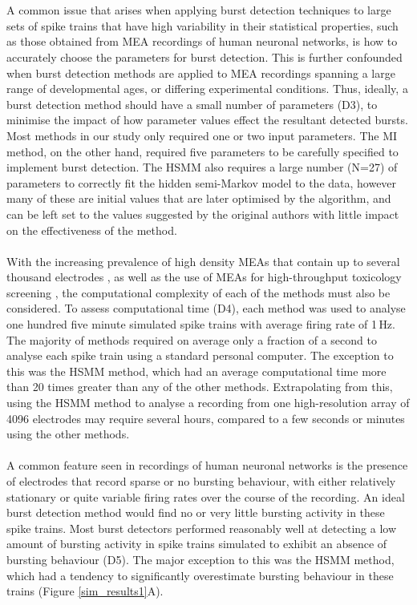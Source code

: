 \documentclass[12pt, titlepage]{article}
\begin{document}
	\\ \\ A common issue that arises when applying burst detection techniques to large sets of spike trains that have high variability in their statistical properties, such as those obtained from MEA recordings of human neuronal networks, is how to accurately choose the parameters for burst detection. This is further confounded when burst detection methods are applied to MEA recordings spanning a large range of developmental ages, or differing experimental conditions. Thus, ideally, a burst detection method should have a small number of parameters (D3), to minimise the impact of how parameter values effect the resultant detected bursts. Most methods in our study only required one or two input parameters. The MI method, on the other hand, required five parameters to be carefully specified to implement burst detection. The HSMM also requires a large number (N=27) of parameters to correctly fit the hidden semi-Markov model to the data, however many of these are initial values that are later optimised by the algorithm, and can be left set to the values suggested by the original authors with little impact on the effectiveness of the method. 
	\\ \\ With the increasing prevalence of high density MEAs that contain up to several thousand electrodes \cite{Maccione2014}, as well as the use of MEAs for high-throughput toxicology screening \cite{Breier2008}, the computational complexity of each of the methods must also be considered. To assess computational time (D4), each method was used to analyse one hundred five minute simulated spike trains with average firing rate of 1$\,$Hz. The majority of methods required on average only a fraction of a second to analyse each spike train using a standard personal computer. The exception to this was the HSMM method, which had an average computational time more than 20 times greater than any of the other methods. Extrapolating from this, using the HSMM method to analyse a recording from one high-resolution array of 4096 electrodes may require several hours, compared to a few seconds or minutes using the other methods.
	\\ \\ A common feature seen in recordings of human neuronal networks is the presence of electrodes that record sparse or no bursting behaviour, with either relatively stationary or quite variable firing rates over the course of the recording. An ideal burst detection method would find no or very little bursting activity in these spike trains. Most burst detectors performed reasonably well at detecting a low amount of bursting activity in spike trains simulated to exhibit an absence of bursting behaviour (D5). The major exception to this was the HSMM method, which had a tendency to significantly overestimate bursting behaviour in these trains (Figure \ref{sim_results1}A).  
\end{document}
